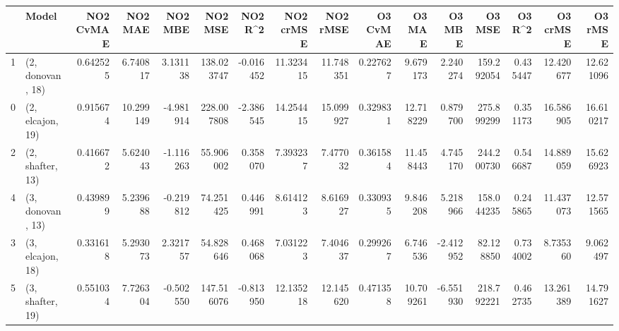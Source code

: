 \begin{tabular}{llrrrrrrrrrrrrrr}
\toprule
{} &             Model &  NO2 CvMAE &    NO2 MAE &   NO2 MBE &     NO2 MSE &   NO2 R\textasciicircum2 &  NO2 crMSE &   NO2 rMSE &  O3 CvMAE &     O3 MAE &    O3 MBE &      O3 MSE &    O3 R\textasciicircum2 &   O3 crMSE &    O3 rMSE \\
\midrule
1 &  (2, donovan, 18) &   0.642525 &   6.740817 &  3.131138 &  138.023747 & -0.016452 &  11.323415 &  11.748351 &  0.227627 &   9.679173 &  2.240274 &  159.292054 &  0.435447 &  12.420677 &  12.621096 \\
0 &  (2, elcajon, 19) &   0.915674 &  10.299149 & -4.981914 &  228.007808 & -2.386545 &  14.254415 &  15.099927 &  0.329831 &  12.718229 &  0.879700 &  275.899299 &  0.351173 &  16.586905 &  16.610217 \\
2 &  (2, shafter, 13) &   0.416672 &   5.624043 & -1.116263 &   55.906002 &  0.358070 &   7.393237 &   7.477032 &  0.361584 &  11.458443 &  4.745170 &  244.200730 &  0.546687 &  14.889059 &  15.626923 \\
4 &  (3, donovan, 13) &   0.439899 &   5.239688 & -0.219812 &   74.251425 &  0.446991 &   8.614123 &   8.616927 &  0.330935 &   9.846208 &  5.218966 &  158.044235 &  0.245865 &  11.437073 &  12.571565 \\
3 &  (3, elcajon, 18) &   0.331618 &   5.293073 &  2.321757 &   54.828646 &  0.468068 &   7.031223 &   7.404637 &  0.299267 &   6.746536 & -2.412952 &   82.128850 &  0.734002 &   8.735360 &   9.062497 \\
5 &  (3, shafter, 19) &   0.551034 &   7.726304 & -0.502550 &  147.516076 & -0.813950 &  12.135218 &  12.145620 &  0.471358 &  10.709261 & -6.551930 &  218.792221 &  0.462735 &  13.261389 &  14.791627 \\
\bottomrule
\end{tabular}
